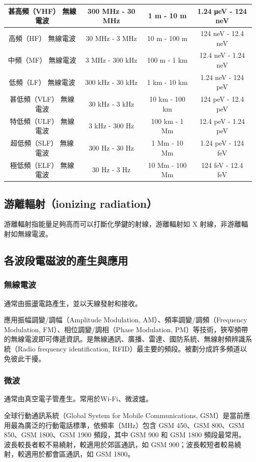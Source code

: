 \documentclass[a4paper,12pt]{report}
\begin{document}
\begin{itemize}
\begin{longtable}[c]{|c|c|c|c|}
\hline
甚高頻（VHF） 無線電波 & 300 MHz - 30 MHz & 1 m - 10 m & 1.24 μeV - 124 neV \\
\hline
高頻（HF） 無線電波 & 30 MHz - 3 MHz & 10 m - 100 m & 124 neV - 12.4 neV \\
\hline
中頻（MF） 無線電波 & 3 MHz - 300 kHz & 100 m - 1 km & 12.4 neV - 1.24 neV \\
\hline
低頻（LF） 無線電波 & 300 kHz - 30 kHz & 1 km - 10 km & 1.24 neV - 124 peV \\
\hline
甚低頻（VLF） 無線電波 & 30 kHz - 3 kHz & 10 km - 100 km & 124 peV - 12.4 peV \\
\hline
特低頻（ULF） 無線電波 & 3 kHz - 300 Hz & 100 km - 1 Mm & 12.4 peV - 1.24 peV \\
\hline
超低頻（SLF） 無線電波 & 300 Hz - 30 Hz & 1 Mm - 10 Mm & 1.24 peV - 124 feV \\
\hline
極低頻（ELF） 無線電波 & 30 Hz - 3 Hz & 10 Mm - 100 Mm & 124 feV - 12.4 feV \\
\hline
\end{longtable}
\subsection{游離輻射（ionizing radiation）}
游離輻射指能量足夠高而可以打斷化學鍵的射線，游離輻射如 X 射線，非游離輻射如無線電波。
\subsection{各波段電磁波的產生與應用}
\subsubsection{無線電波}
通常由振盪電路產生，並以天線發射和接收。

應用振幅調變/調幅（Amplitude Modulation, AM）、頻率調變/調頻（Frequency Modulation, FM）、相位調變/調相（Phase Modulation, PM）等技術，狹窄頻帶的無線電波即可傳遞資訊。是無線通訊、廣播、雷達、國防系統、無線射頻辨識系統（Radio frequency identification, RFID）最主要的頻段。被劃分成許多頻道以免彼此干擾。
\subsubsection{微波}
通常由真空電子管產生。常用於Wi-Fi、微波爐。

全球行動通訊系統（Global System for Mobile Communications, GSM）是當前應用最為廣泛的行動電話標準，依頻率（MHz）包含 GSM 450、GSM 800、GSM 850、GSM 1800、GSM 1900 頻段，其中 GSM 900 和 GSM 1800 頻段最常用。波長較長者較不易繞射，較適用於郊區通訊，如 GSM 900；波長較短者較易繞射，較適用於都會區通訊，如 GSM 1800。


\end{itemize}
\end{document}

